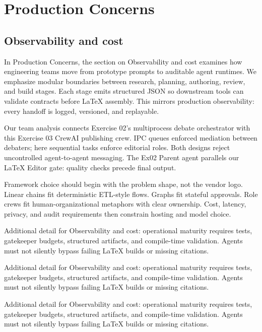 \section{Production Concerns}

\subsection{Observability and cost}
In Production Concerns, the section on Observability and cost examines how engineering teams move from prototype prompts to auditable agent runtimes. We emphasize modular boundaries between research, planning, authoring, review, and build stages. Each stage emits structured JSON so downstream tools can validate contracts before LaTeX assembly. This mirrors production observability: every handoff is logged, versioned, and replayable. \cite{crewai2024} \cite{langgraph2024} \cite{mcp2024}

Our team analysis connects Exercise 02's multiprocess debate orchestrator with this Exercise 03 CrewAI publishing crew. IPC queues enforced mediation between debaters; here sequential tasks enforce editorial roles. Both designs reject uncontrolled agent-to-agent messaging. The Ex02 Parent agent parallels our LaTeX Editor gate: quality checks precede final output. \cite{crewai2024} \cite{langgraph2024} \cite{mcp2024}

Framework choice should begin with the problem shape, not the vendor logo. Linear chains fit deterministic ETL-style flows. Graphs fit stateful approvals. Role crews fit human-organizational metaphors with clear ownership. Cost, latency, privacy, and audit requirements then constrain hosting and model choice. \cite{crewai2024} \cite{langgraph2024} \cite{mcp2024}

Additional detail for Observability and cost: operational maturity requires tests, gatekeeper budgets, structured artifacts, and compile-time validation. Agents must not silently bypass failing LaTeX builds or missing citations. \cite{crewai2024} \cite{langgraph2024} \cite{mcp2024}

Additional detail for Observability and cost: operational maturity requires tests, gatekeeper budgets, structured artifacts, and compile-time validation. Agents must not silently bypass failing LaTeX builds or missing citations. \cite{crewai2024} \cite{langgraph2024} \cite{mcp2024}

Additional detail for Observability and cost: operational maturity requires tests, gatekeeper budgets, structured artifacts, and compile-time validation. Agents must not silently bypass failing LaTeX builds or missing citations. \cite{crewai2024} \cite{langgraph2024} \cite{mcp2024}

